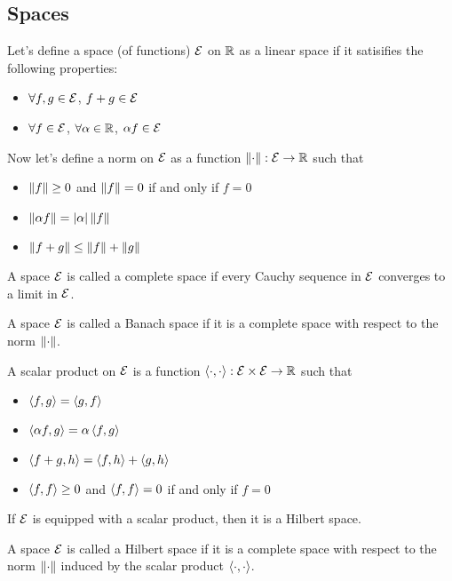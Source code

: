 \subsection{Spaces}
Let's define a space (of functions) $\mathcal{E}$ on $\mathbb{R}$ as a linear space if it
satisifies the following properties:
\begin{itemize}
    \item $\forall f,g\in\mathcal{E}$, $f+g\in\mathcal{E}$
    \item $\forall f\in\mathcal{E}$, $\forall \alpha\in\mathbb{R}$, $\alpha f\in\mathcal{E}$
\end{itemize}
Now let's define a norm on $\mathcal{E}$ as a function $\left\| \cdot \right\|:\mathcal{E}\rightarrow\mathbb{R}$ such that
\begin{itemize}
    \item $\left\| f \right\|\geq 0$ and $\left\| f \right\|=0$ if and only if $f=0$
    \item $\left\| \alpha f \right\|=\left| \alpha\right|\left\| f \right\|$
    \item $\left\| f+g \right\|\leq \left\| f \right\|+\left\| g \right\|$
\end{itemize}
\begin{definition}
    A space $\mathcal{E}$ is called a complete space if every Cauchy sequence in $\mathcal{E}$ converges to a limit in $\mathcal{E}$.
\end{definition}
\begin{definition}
    A space $\mathcal{E}$ is called a Banach space if it is a complete space with respect to the norm $\left\| \cdot \right\|$.
\end{definition}
\begin{definition}
    A scalar product on $\mathcal{E}$ is a function $\left\langle \cdot,\cdot\right\rangle:\mathcal{E}\times\mathcal{E}\rightarrow\mathbb{R}$ such that
    \begin{itemize}
        \item $\left\langle f,g\right\rangle=\left\langle g,f\right\rangle$
        \item $\left\langle \alpha f,g\right\rangle=\alpha\left\langle f,g\right\rangle$
        \item $\left\langle f+g,h\right\rangle=\left\langle f,h\right\rangle+\left\langle g,h\right\rangle$
        \item $\left\langle f,f\right\rangle\geq 0$ and $\left\langle f,f\right\rangle=0$ if and only if $f=0$
    \end{itemize}
\end{definition}
If $\mathcal{E}$ is equipped with a scalar product, then it is a Hilbert space.
\begin{definition}
    A space $\mathcal{E}$ is called a Hilbert space if it is a complete space with respect to the norm $\left\| \cdot \right\|$ induced by the scalar product $\left\langle \cdot,\cdot\right\rangle$.
\end{definition}
